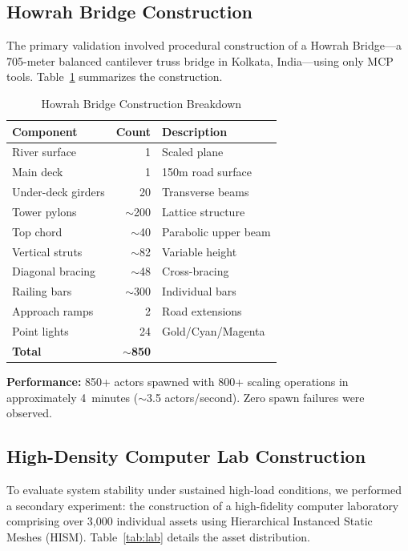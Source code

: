 \documentclass[conference]{IEEEtran}
\begin{document}
\subsection{Howrah Bridge Construction}

The primary validation involved procedural construction of a Howrah Bridge---a 705-meter balanced cantilever truss bridge in Kolkata, India---using only MCP tools. Table~\ref{tab:bridge} summarizes the construction.

\begin{table}[htbp]
\caption{Howrah Bridge Construction Breakdown}
\label{tab:bridge}
\centering
\begin{tabular}{lrl}
\toprule
\textbf{Component} & \textbf{Count} & \textbf{Description} \\
\midrule
River surface & 1 & Scaled plane \\
Main deck & 1 & 150m road surface \\
Under-deck girders & 20 & Transverse beams \\
Tower pylons & $\sim$200 & Lattice structure \\
Top chord & $\sim$40 & Parabolic upper beam \\
Vertical struts & $\sim$82 & Variable height \\
Diagonal bracing & $\sim$48 & Cross-bracing \\
Railing bars & $\sim$300 & Individual bars \\
Approach ramps & 2 & Road extensions \\
Point lights & 24 & Gold/Cyan/Magenta \\
\midrule
\textbf{Total} & \textbf{$\sim$850} & \\
\bottomrule
\end{tabular}
\end{table}

\textbf{Performance:} 850+ actors spawned with 800+ scaling operations in approximately 4~minutes ($\sim$3.5 actors/second). Zero spawn failures were observed.

\subsection{High-Density Computer Lab Construction}

To evaluate system stability under sustained high-load conditions, we performed a secondary experiment: the construction of a high-fidelity computer laboratory comprising over 3,000 individual assets using Hierarchical Instanced Static Meshes (HISM). Table~\ref{tab:lab} details the asset distribution.
\end{document}
